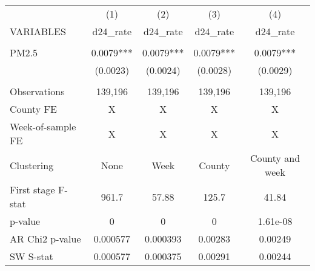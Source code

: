 \begin{tabular}{lcccc} \hline
 & (1) & (2) & (3) & (4) \\
VARIABLES & d24\_rate & d24\_rate & d24\_rate & d24\_rate \\ \hline
 &  &  &  &  \\
PM2.5 & 0.0079*** & 0.0079*** & 0.0079*** & 0.0079*** \\
 & (0.0023) & (0.0024) & (0.0028) & (0.0029) \\
 &  &  &  &  \\
Observations & 139,196 & 139,196 & 139,196 & 139,196 \\
County FE & X & X & X & X \\
Week-of-sample FE & X & X & X & X \\
Clustering & None & Week & County & County and week \\
First stage F-stat & 961.7 & 57.88 & 125.7 & 41.84 \\
p-value & 0 & 0 & 0 & 1.61e-08 \\
AR Chi2 p-value & 0.000577 & 0.000393 & 0.00283 & 0.00249 \\
 SW S-stat & 0.000577 & 0.000375 & 0.00291 & 0.00244 \\ \hline
\end{tabular}
